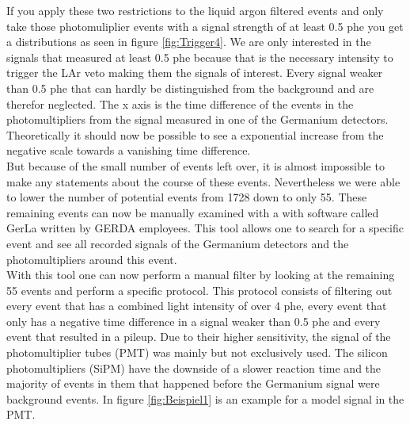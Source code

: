 If you apply these two restrictions to the liquid argon filtered events and only take those photomuliplier events with a signal strength of at least 0.5 phe you get a distributions as seen in figure \ref{fig:Trigger4}.
We are only interested in the signals that measured at least 0.5 phe because that is the necessary intensity to trigger the LAr veto making them the signals of interest.
Every signal weaker than 0.5 phe that can hardly be distinguished from the background and are therefor neglected.  
The x axis is the time difference of the events in the photomultipliers from the signal measured in one of the Germanium detectors.
Theoretically it should now be possible to see a exponential increase from the negative scale towards a vanishing time difference.
\\

But because of the small number of events left over, it is almost impossible to make any statements about the course of these events.
Nevertheless we were able to lower the number of potential  events from 1728 down to only 55.  
These remaining events can now be manually examined with a with software called GerLa written by GERDA employees.
This tool allows one to search for a specific event and see all recorded signals of the Germanium detectors and the photomultipliers around this event.
\\

With this tool one can now perform a manual filter by looking at the remaining 55 events and perform a specific protocol.
This protocol consists of filtering out every event that has a combined light intensity of over 4 phe, every event that only has a negative time difference in a signal weaker than 0.5 phe and every event that resulted in a pileup.
Due to their higher sensitivity, the signal of the photomultiplier tubes (PMT) was mainly but not exclusively used.
The silicon photomultipliers (SiPM) have the downside of a slower reaction time and the majority of events in them that happened before the Germanium signal were background events.
In figure \ref{fig:Beispiel1} is an example for a model signal in the PMT.
\\

